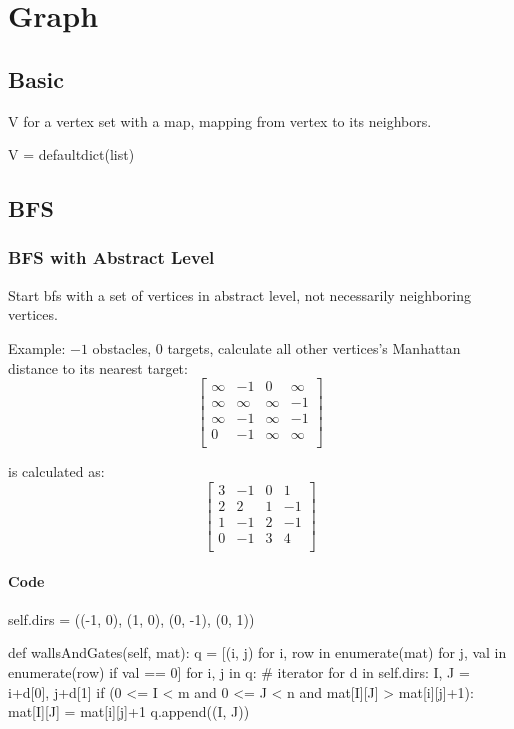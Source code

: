 \chapter{Graph}

\section{Basic}
 V for a vertex set with a map, mapping from vertex to its neighbors.
\begin{python}
V = defaultdict(list)
\end{python}

\section{BFS}
\subsection{BFS with Abstract Level}
Start bfs with a set of vertices in abstract level, not necessarily neighboring vertices.

Example:
$-1$ obstacles, $0$ targets, calculate all other vertices's Manhattan distance to its nearest target:
$$
\begin{bmatrix}
\infty & -1 & 0 & \infty \\
\infty & \infty & \infty & -1 \\
\infty & -1 & \infty & -1 \\
0 & -1 & \infty & \infty \\
\end{bmatrix} 
$$

is calculated as:
$$
\begin{bmatrix}
3 & -1 & 0 & 1 \\
2 & 2 & 1 & -1 \\
1 & -1 & 2 & -1 \\
0 & -1 & 3 & 4 \\
\end{bmatrix}
$$

\subsubsection*{Code}
\begin{python}
self.dirs = ((-1, 0), (1, 0), (0, -1), (0, 1))

def wallsAndGates(self, mat):
    q = [(i, j) for i, row in enumerate(mat) 
         for j, val in enumerate(row) if val == 0]
    for i, j in q:  # iterator
        for d in self.dirs:
            I, J = i+d[0], j+d[1]
            if (0 <= I < m and  0 <= J < n and 
                mat[I][J] > mat[i][j]+1):
                mat[I][J] = mat[i][j]+1
                q.append((I, J))
\end{python}



